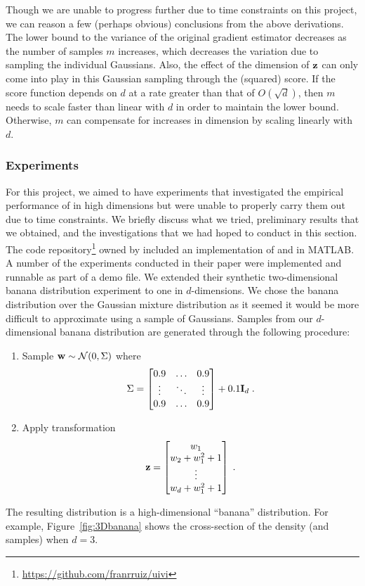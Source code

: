 \documentclass[10pt]{article}
\begin{document}
Though we are unable to progress further due to time constraints on this project, we can reason a few (perhaps obvious) conclusions from the above derivations. The lower bound to the variance of the original gradient estimator decreases as the number of samples $m$ increases, which decreases the variation due to sampling the individual Gaussians. Also, the effect of the dimension of $\mathbf{z}$ can only come into play in this Gaussian sampling through the (squared) score. If the score function depends on $d$ at a rate greater than that of $O(\sqrt{d})$, then $m$ needs to scale faster than linear with $d$ in order to maintain the lower bound. Otherwise, $m$ can compensate for increases in dimension by scaling linearly with $d$.


\subsubsection{Experiments}

For this project, we aimed to have experiments that investigated the empirical performance of \uivi in high dimensions but were unable to properly carry them out due to time constraints. We briefly discuss what we tried, preliminary results that we obtained, and the investigations that we had hoped to conduct in this section.
\\

The code repository\footnote{\url{https://github.com/franrruiz/uivi}} owned by \citeauthor{Titsias:2019} included an implementation of \uivi and \sivi in MATLAB. A number of the experiments conducted in their paper were implemented and runnable as part of a \uivi demo file. We extended their synthetic two-dimensional banana distribution experiment to one in $d$-dimensions. We chose the banana distribution over the Gaussian mixture distribution as it seemed it would be more difficult to approximate using a sample of Gaussians. Samples from our $d$-dimensional banana distribution are generated through the following procedure:
\begin{enumerate}
\item
Sample $\mathbf{w}\sim\mathcal{N}(0,\Sigma)$ where
\[
\Sigma =
\begin{bmatrix}
0.9 & \ldots & 0.9 \\
\vdots & \ddots & \vdots \\
0.9 & \ldots & 0.9
\end{bmatrix}
+ 0.1\mathbf{I}_d \;.
\]
\item
Apply transformation
\[
\mathbf{z} = \begin{bmatrix}
w_1 \\
w_2 + w_1^2 + 1 \\
\vdots \\
w_d + w_1^2 + 1
\end{bmatrix} \;.
\]
\end{enumerate}
The resulting distribution is a high-dimensional ``banana'' distribution. For example, Figure~\ref{fig:3Dbanana} shows the cross-section of the density (and samples) when $d=3$.
\\
\end{document}
